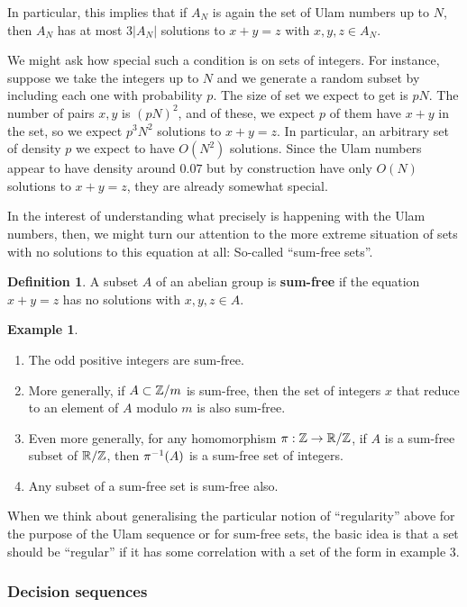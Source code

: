 \documentclass{article}
\theoremstyle{definition}
\newtheorem{definition}{Definition}
\newtheorem{example}{Example}
\theoremstyle{remark}
\numberwithin{equation}{section}
\begin{document}
In particular, this implies that if $A_N$ is again the set of Ulam
numbers up to $N$, then $A_N$ has at most $3|A_N|$ solutions to $x+y =
z$ with $x, y, z \in A_N$.  

We might ask how special such a condition is on sets of integers.  For
instance, suppose we take the integers up to $N$ and we generate a
random subset by including each one with probability $p$.  The size of
set we expect to get is $pN$.  The number of pairs $x,y$ is $(pN)^2$,
and of these, we expect $p$ of them have $x+y$ in the set, so we
expect $p^3 N^2$ solutions to $x+y=z$.  In particular, an arbitrary
set of density $p$ we expect to have $O(N^2)$ solutions.  Since the
Ulam numbers appear to have density around $0.07$ but by construction
have only $O(N)$ solutions to $x+y=z$, they are already somewhat
special.  

In the interest of understanding what precisely is happening with the
Ulam numbers, then, we might turn our attention to the more extreme
situation of sets with no solutions to this equation at all: So-called
``sum-free sets''.  

\begin{definition}
  A subset $A$ of an abelian group is \textbf{sum-free} if the
  equation $x+y=z$ has no solutions with $x, y, z \in A$.
\end{definition}

\begin{example}
\begin{enumerate}
\item The odd positive integers are sum-free.  
\item More generally, if $A \subset \mathbb{Z}/m$ is sum-free, then the set of
  integers $x$ that reduce to an element of $A$ modulo $m$ is also
  sum-free.  
\item Even more generally, for any homomorphism $\pi : \mathbb{Z} \to \mathbb{R}/\mathbb{Z}$,
  if $A$ is a sum-free subset of $\mathbb{R}/\mathbb{Z}$, then $\pi^{-1}(A)$ is a
  sum-free set of integers.
\item Any subset of a sum-free set is sum-free also.
\end{enumerate}
\end{example}

When we think about generalising the particular notion of
``regularity'' above for the purpose of the Ulam sequence or for
sum-free sets, the basic idea is that a set should be ``regular'' if
it has some correlation with a set of the form in example 3.

\subsubsection{Decision sequences}
\end{document}
